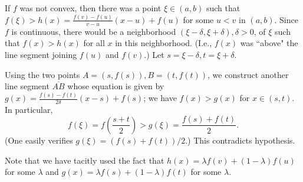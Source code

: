 \documentclass[12pt]{article}
\begin{document}
If $f$ was not convex, then there was a point $\xi\in(a, b)$ such
that $f(\xi)>h(x)=\frac{f(v)-f(u)}{v-u}(x-u)+f(u)$ for some $u<v$ in
$(a,b)$. Since $f$ is continuous, there would be a neighborhood
$(\xi-\delta, \xi+\delta), \delta>0$, of $\xi$ such that $f(x)>h(x)$
for all $x$ in this neighborhood. (I.e., $f(x)$ was ``above" the
line segment joining $f(u)$ and $f(v)$.) Let $s=\xi-\delta,
t=\xi+\delta$.

Using the two points $A=(s, f(s)), B=(t, f(t))$, we construct
another line segment $\overline{AB}$ whose equation is given by
$g(x)=\frac{f(s)-f(t)}{2\delta}(x-s)+f(s)$; we have $f(x)>g(x)$ for
$x\in(s, t)$. In particular,
\begin{equation}
\displaystyle
f(\xi)=f\left(\frac{s+t}{2}\right)>g(\xi)=\frac{f(s)+f(t)}{2}.
\end{equation}
(One easily verifies $g(\xi)=(f(s)+f(t))/2$.) This contradicts
hypothesis.

Note that we have tacitly used the fact that $h(x)=\lambda
f(v)+(1-\lambda)f(u)$ for some $\lambda$ and $g(x)=\lambda
f(s)+(1-\lambda)f(t)$ for some $\lambda$.

\end{document}
